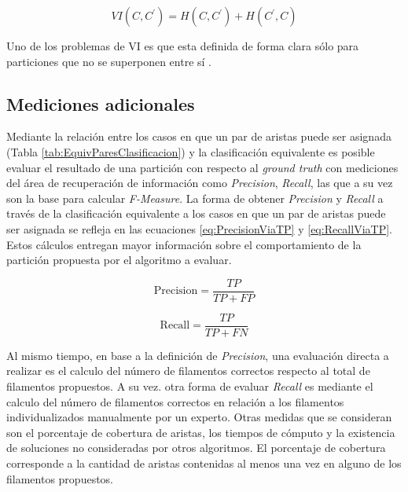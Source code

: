 \begin{equation}
VI(C,C^{\prime}) = H(C,C^{\prime}) + H(C^{\prime},C)
\label{eq:VI}
\end{equation}

Uno de los problemas de VI es que esta definida de forma clara s\'olo para particiones que no se superponen entre s\'i .

\subsection{Mediciones adicionales}

Mediante la relaci\'on entre los casos en que un par de aristas puede ser asignada (Tabla \ref{tab:EquivParesClasificacion}) y la clasificaci\'on equivalente es posible evaluar el resultado de una partici\'on con respecto al {\it ground truth} con mediciones del \'area de recuperaci\'on de informaci\'on como {\it Precision}, {\it Recall}, las que a su vez son la base para calcular {\it F-Measure}. La forma de obtener {\it Precision} y {\it Recall} a trav\'es de la clasificaci\'on equivalente a los casos en que un par de aristas puede ser asignada se refleja en las ecuaciones \ref{eq:PrecisionViaTP} y \ref{eq:RecallViaTP}.
Estos c\'alculos entregan mayor informaci\'on sobre el comportamiento de la partici\'on propuesta por el algoritmo a evaluar. 

\begin{equation}
    \text{Precision} = \frac{TP}{TP + FP}
    \label{eq:PrecisionViaTP}
\end{equation}

\begin{equation}
    \text{Recall} = \frac{TP}{TP + FN}
    \label{eq:RecallViaTP}
\end{equation}

Al mismo tiempo, en base a la definici\'on de {\it Precision}, una evaluaci\'on directa a realizar es el calculo del n\'umero de filamentos correctos respecto al total de filamentos propuestos. A su vez. otra forma de evaluar {\it Recall} es mediante el calculo del n\'umero de filamentos correctos en relaci\'on a los filamentos individualizados manualmente por un experto. Otras medidas que se consideran son el porcentaje de cobertura de aristas, los tiempos de c\'omputo y la existencia de soluciones no consideradas por otros algoritmos. El porcentaje de cobertura corresponde a la cantidad de aristas contenidas al menos una vez en alguno de los filamentos propuestos.

